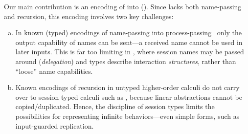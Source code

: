 

Our main contribution is 
an encoding of \HOp into \HO ().  
Since \HO lacks 
both name-passing and recursion, this encoding involves two key challenges:
\begin{enumerate}[a.]
\item In known (typed) 
encodings of name-passing into process-passing~\cite{SaWabook} %
only the output capability of names can be sent---a received name cannot be used in later inputs.
This is far too limiting in \HOp, where 
 session names %
 may be passed around (\emph{delegation})
and types describe interaction  \emph{structures}, rather than ``loose'' name capabilities. %



\item %
Known encodings of recursion in untyped higher-order calculi
do not carry over to session typed calculi such as \HOp,
because linear abstractions cannot be copied/duplicated. Hence, the discipline of session types  limits 
the possibilities for representing infinite behaviors---even simple forms, such as input-guarded replication.
\end{enumerate}





